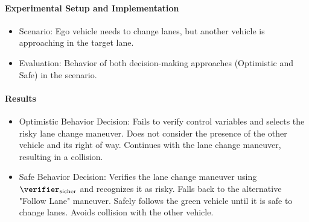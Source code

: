 \paragraph*{Experimental Setup and Implementation}

\begin{itemize}
    \item Scenario: Ego vehicle needs to change lanes, but another vehicle is approaching in the target lane.
    \item Evaluation:
          Behavior of both decision-making approaches (Optimistic and Safe) in the scenario.
\end{itemize}

\paragraph*{Results}

\begin{itemize}
    \item Optimistic Behavior Decision:
          Fails to verify control variables and selects the risky lane change maneuver.
          Does not consider the presence of the other vehicle and its right of way.
          Continues with the lane change maneuver, resulting in a collision.
    \item Safe Behavior Decision:
          Verifies the lane change maneuver using $\verifier_\text{sicher}$ and recognizes it as risky.
          Falls back to the alternative "Follow Lane" maneuver.
          Safely follows the green vehicle until it is safe to change lanes.
          Avoids collision with the other vehicle.
\end{itemize}
